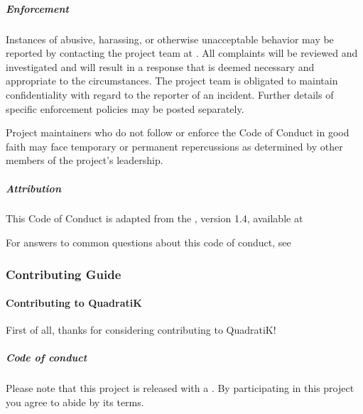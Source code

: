 \documentclass[letterpaper,10pt,english,openany,oneside]{sphinxmanual}
\begin{document}
{{{{\subparagraph{Enforcement}
\label{\detokenize{development/CODE_OF_CONDUCT:enforcement}}
\sphinxAtStartPar
Instances of abusive, harassing, or otherwise unacceptable behavior may be
reported by contacting the project team at .
All complaints will be reviewed and investigated and will result in a response that
is deemed necessary and appropriate to the circumstances. The project team is
obligated to maintain confidentiality with regard to the reporter of an incident.
Further details of specific enforcement policies may be posted separately.

\sphinxAtStartPar
Project maintainers who do not follow or enforce the Code of Conduct in good
faith may face temporary or permanent repercussions as determined by other
members of the project’s leadership.


\subparagraph{Attribution}
\label{\detokenize{development/CODE_OF_CONDUCT:attribution}}
\sphinxAtStartPar
This Code of Conduct is adapted from the , version 1.4,
available at 

\sphinxAtStartPar
For answers to common questions about this code of conduct, see


\subsubsection{Contributing Guide}
\label{\detokenize{development/index:contributing-guide}}
\sphinxstepscope


\paragraph{Contributing to QuadratiK}
\label{\detokenize{development/CONTRIBUTING:contributing-to-quadratik}}\label{\detokenize{development/CONTRIBUTING::doc}}
\sphinxAtStartPar
First of all, thanks for considering contributing to QuadratiK!


\subparagraph{Code of conduct}
\label{\detokenize{development/CONTRIBUTING:code-of-conduct}}
\sphinxAtStartPar
Please note that this project is released with a . By participating in this project you agree to abide by its terms.


}}}}
\end{document}
